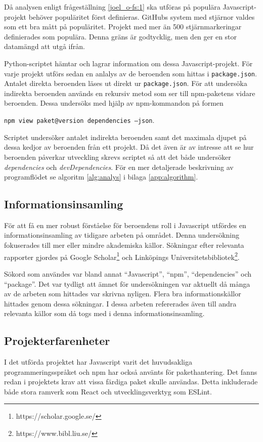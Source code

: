 Då analysen enligt frågeställning \ref{joel_o-fs:1} ska utföras på populära Javascript-projekt behöver populäritet först definieras. GitHubs system med stjärnor valdes som ett bra mått på populäritet. Projekt med mer än 500 stjärnmarkeringar definierades som populära. Denna gräns är godtycklig, men den ger en stor datamängd att utgå ifrån.

Python-scriptet hämtar och lagrar information om dessa Javascript-projekt. För varje projekt utförs sedan en anlalys av de beroenden som hittas i \texttt{package.json}.
Antalet direkta beroenden läses ut direkt ur \texttt{package.json}. För att undersöka indirekta beroenden används en rekursiv metod som ser till npm-paketens vidare beroenden. Dessa undersöks med hjälp av npm-kommandon på formen

\begin{center}
  \texttt{npm view paket@version dependencies --json}.
\end{center}

Scriptet undersöker antalet indirekta beroenden samt det maximala djupet på dessa kedjor av beroenden från ett projekt. Då det även är av intresse att se hur beroenden påverkar utveckling skrevs scriptet så att det både undersöker \textit{dependencies} och \textit{devDependencies}. För en mer detaljerade beskrivning av programflödet se algoritm \ref{alg:analys} i bilaga \ref{app:algorithm}.

\subsection{Informationsinsamling}
För att få en mer robust förståelse för beroendens roll i Javascript utfördes en informationsinsamling av tidigare arbeten på området. Denna undersökning fokuserades till mer eller mindre akademiska källor. Sökningar efter relevanta rapporter gjordes på Google Scholar\footnote{https://scholar.google.se/} och Linköpings Universitetsbibliotek\footnote{https://www.bibl.liu.se/}.

Sökord som användes var bland annat ``Javascript'', ``npm'', ``dependencies'' och ``package''. Det var tydligt att ämnet för undersökningen var aktuellt då många av de arbeten som hittades var skrivna nyligen. Flera bra informationskällor hittades genom dessa sökningar. I dessa arbeten refererades även till andra relevanta källor som då togs med i denna informationsinsamling.

\subsection{Projekterfarenheter}
I det utförda projektet har Javascript varit det huvudsakliga programmeringsspråket och npm har också använts för pakethantering. Det fanns redan i projektets krav att vissa färdiga paket skulle användas. Detta inkluderade både stora ramverk som React och utvecklingsverktyg som ESLint.


